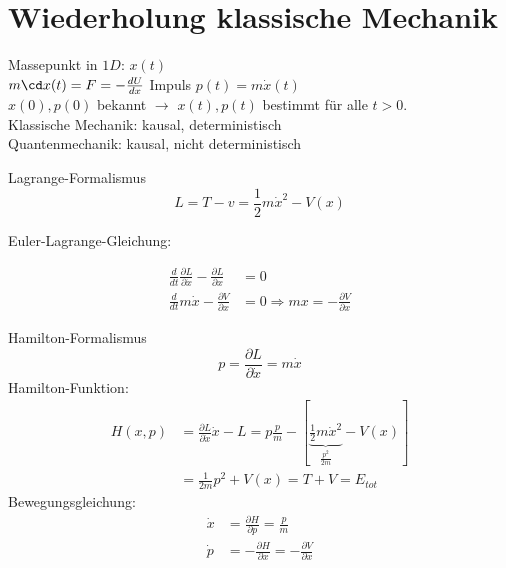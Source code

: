 \section{Wiederholung klassische Mechanik} %
\label{sec:Wiederholung_klassische_Mechanik}
Massepunkt in $1D$: $x(t)$ \\
$m \cd x(t) = F = -\frac{dU}{dx}$ \quad Impuls $p(t) = m \dot{x}(t)$ \\
$x(0) , p(0)$ bekannt $\longrightarrow$ $x(t), p(t)$ bestimmt für alle $t >0$. \\
Klassische Mechanik: kausal, deterministisch \\
Quantenmechanik: kausal, nicht deterministisch
\begin{erl}{Lagrange-Formalismus}
    \begin{equation*}
        L=T-v= \frac{1}{2} m \dot{x}^2 - V(x)
    \end{equation*}    

    Euler-Lagrange-Gleichung:

    \begin{align*}
        \frac{d}{dt} \frac{\partial L}{\partial \dot{x}} - \frac{\partial L}{\partial x} &= 0 \\
        \frac{d}{dt} m \dot{x} - \frac{\partial V}{\partial x} &= 0 \Rightarrow mx = - \frac{\partial V}{\partial x}
    \end{align*}
\end{erl}
\begin{erl}{Hamilton-Formalismus}
    \begin{equation*}
        p = \frac{\partial L}{\partial\dot{x}} = m \dot{x}
    \end{equation*}
    Hamilton-Funktion:
    \begin{align*}
        H(x,p)
        &=
        \frac{\partial L}{\partial \dot{x}} \dot{x} - L = p \frac{p}{m} - 
            \left[ \underbrace{\frac{1}{2} m \dot{x}^2}_{\frac{p^2}{2m}} - V(x)
            \right] \\
        &=
        \frac{1}{2m} p^2 + V(x) = T + V = E_{tot}
    \end{align*}
    Bewegungsgleichung:
    \begin{align*}
        \dot{x} &= \frac{\partial H}{\partial p} = \frac{p}{m} \\
        \dot{p} &= - \frac{\partial H}{\partial x} = - \frac{\partial
        V}{\partial x}
    \end{align*}
\end{erl}
